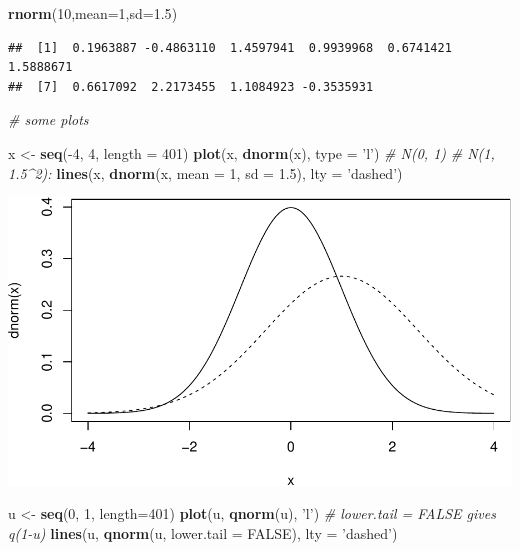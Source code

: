 \documentclass[]{article}
\newenvironment{Shaded}{\begin{snugshade}}{\end{snugshade}}
\newcommand{\KeywordTok}[1]{\textcolor[rgb]{0.13,0.29,0.53}{\textbf{{#1}}}}
\newcommand{\DataTypeTok}[1]{\textcolor[rgb]{0.13,0.29,0.53}{{#1}}}
\newcommand{\DecValTok}[1]{\textcolor[rgb]{0.00,0.00,0.81}{{#1}}}
\newcommand{\FloatTok}[1]{\textcolor[rgb]{0.00,0.00,0.81}{{#1}}}
\newcommand{\StringTok}[1]{\textcolor[rgb]{0.31,0.60,0.02}{{#1}}}
\newcommand{\CommentTok}[1]{\textcolor[rgb]{0.56,0.35,0.01}{\textit{{#1}}}}
\newcommand{\OtherTok}[1]{\textcolor[rgb]{0.56,0.35,0.01}{{#1}}}
\newcommand{\NormalTok}[1]{{#1}}
\begin{document}
\begin{Shaded}
\begin{Highlighting}[]
\KeywordTok{rnorm}\NormalTok{(}\DecValTok{10}\NormalTok{,}\DataTypeTok{mean=}\DecValTok{1}\NormalTok{,}\DataTypeTok{sd=}\FloatTok{1.5}\NormalTok{)}
\end{Highlighting}
\end{Shaded}

\begin{verbatim}
##  [1]  0.1963887 -0.4863110  1.4597941  0.9939968  0.6741421  1.5888671
##  [7]  0.6617092  2.2173455  1.1084923 -0.3535931
\end{verbatim}

\begin{Shaded}
\begin{Highlighting}[]
\CommentTok{# some plots}

\NormalTok{x <-}\StringTok{ }\KeywordTok{seq}\NormalTok{(-}\DecValTok{4}\NormalTok{, }\DecValTok{4}\NormalTok{, }\DataTypeTok{length =} \DecValTok{401}\NormalTok{)}
\KeywordTok{plot}\NormalTok{(x, }\KeywordTok{dnorm}\NormalTok{(x), }\DataTypeTok{type =} \StringTok{'l'}\NormalTok{) }\CommentTok{# N(0, 1)}
\CommentTok{# N(1, 1.5^2):}
\KeywordTok{lines}\NormalTok{(x, }\KeywordTok{dnorm}\NormalTok{(x, }\DataTypeTok{mean =} \DecValTok{1}\NormalTok{, }\DataTypeTok{sd =} \FloatTok{1.5}\NormalTok{), }\DataTypeTok{lty =} \StringTok{'dashed'}\NormalTok{)}
\end{Highlighting}
\end{Shaded}

\includegraphics{probability_files/figure-latex/unnamed-chunk-17-1.pdf}

\begin{Shaded}
\begin{Highlighting}[]
\NormalTok{u <-}\StringTok{ }\KeywordTok{seq}\NormalTok{(}\DecValTok{0}\NormalTok{, }\DecValTok{1}\NormalTok{, }\DataTypeTok{length=}\DecValTok{401}\NormalTok{)}
\KeywordTok{plot}\NormalTok{(u, }\KeywordTok{qnorm}\NormalTok{(u), }\StringTok{'l'}\NormalTok{)}
\CommentTok{# lower.tail = FALSE gives q(1-u)}
\KeywordTok{lines}\NormalTok{(u, }\KeywordTok{qnorm}\NormalTok{(u, }\DataTypeTok{lower.tail =} \OtherTok{FALSE}\NormalTok{), }\DataTypeTok{lty =} \StringTok{'dashed'}\NormalTok{)}
\end{Highlighting}
\end{Shaded}
\end{document}
